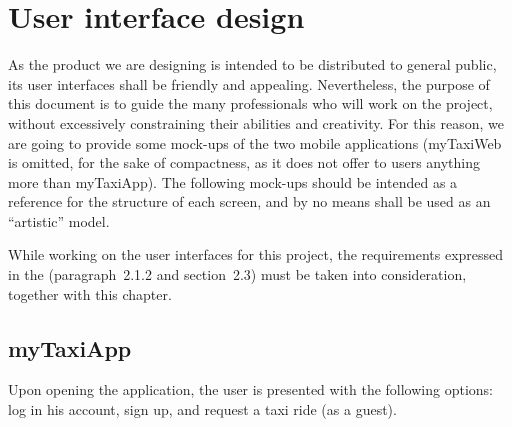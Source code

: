 \chapter{User interface design} \label{chap:userinterface}
As the product we are designing is intended to be distributed to general public, its user interfaces shall be friendly and appealing. Nevertheless, the purpose of this document is to guide the many professionals who will work on the project, without excessively constraining their abilities and creativity. For this reason, we are going to provide some mock-ups of the two mobile applications (myTaxiWeb is omitted, for the sake of compactness, as it does not offer to users anything more than myTaxiApp). The following mock-ups should be intended as a reference for the structure of each screen, and by no means shall be used as an ``artistic'' model.

While working on the user interfaces for this project, the requirements expressed in the \rasd (paragraph~2.1.2 and section~2.3) must be taken into consideration, together with this chapter.


\section{myTaxiApp}
Upon opening the application, the user is presented with the following options: log in his account, sign up, and request a taxi ride (as a guest).

